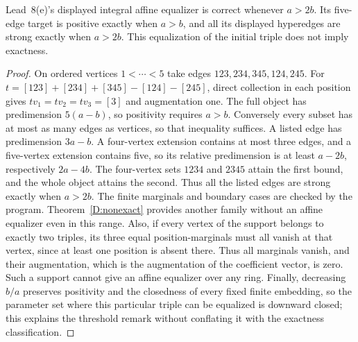 \begin{proposition}
\label{D:five-edge}
Lead~8(e)'s displayed integral affine equalizer is correct whenever
$a>2b$. Its five-edge target is positive exactly when $a>b$, and
all its displayed hyperedges are strong exactly when $a>2b$.
This equalization of the initial triple does not imply exactness.
\end{proposition}
\begin{proof}
On ordered vertices $1<\cdots<5$ take edges
$123,234,345,124,245$. For
$t=[123]+[234]+[345]-[124]-[245]$, direct collection in each
position gives $tv_1=tv_2=tv_3=[3]$ and augmentation one.
The full object has predimension $5(a-b)$, so positivity requires
$a>b$. Conversely every subset has at most as many edges as
vertices, so that inequality suffices. A listed edge has
predimension $3a-b$. A four-vertex extension contains at most
three edges, and a five-vertex extension contains five, so its
relative predimension is at least $a-2b$, respectively $2a-4b$.
The four-vertex sets $1234$ and $2345$ attain the first bound,
and the whole object attains the second. Thus all the listed
edges are strong exactly when $a>2b$. The finite marginals and
boundary cases are checked by the program. Theorem~\ref{D:nonexact}
provides another family without an affine equalizer even in this
range. Also, if every vertex of the support belongs to exactly two
triples, its three equal position-marginals must all vanish at that
vertex, since at least one position is absent there. Thus all
marginals vanish, and their augmentation, which is the augmentation
of the coefficient vector, is zero. Such a support cannot give an
affine equalizer over any ring. Finally, decreasing $b/a$ preserves
positivity and the closedness of every fixed finite embedding, so
the parameter set where this particular triple can be equalized
is downward closed; this explains the threshold remark without
conflating it with the exactness classification.
\end{proof}

